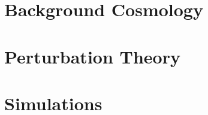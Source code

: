 %
%


\chapter{Background Cosmology}\label{ch:cosmological_structure_formation:background}


\chapter{Perturbation Theory}\label{ch:cosmological_structure_formation:perturbation_theory}


\chapter{Simulations}\label{ch:cosmological_structure_formation:simulations}
